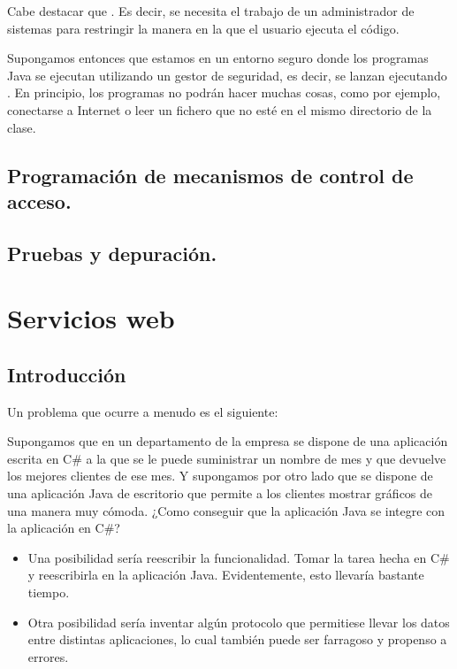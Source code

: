 \documentclass[letterpaper,10pt,spanish]{sphinxmanual}
\begin{document}
Cabe destacar que . Es decir, se necesita el trabajo de un administrador de sistemas para restringir la manera en la que el usuario ejecuta el código.

Supongamos entonces que estamos en un entorno seguro donde los programas Java se ejecutan utilizando un gestor de seguridad, es decir, se lanzan ejecutando . En principio, los programas no podrán hacer muchas cosas, como por ejemplo, conectarse a Internet o leer un fichero que no esté en el mismo directorio de la clase.


\section{Programación de mecanismos de control de acceso.}
\label{\detokenize{textos/tema5:programacion-de-mecanismos-de-control-de-acceso}}

\section{Pruebas y depuración.}
\label{\detokenize{textos/tema5:pruebas-y-depuracion}}

\chapter{Servicios web}
\label{\detokenize{textos/tema6:servicios-web}}\label{\detokenize{textos/tema6::doc}}

\section{Introducción}
\label{\detokenize{textos/tema6:introduccion}}
Un problema que ocurre a menudo es el siguiente: 

Supongamos que en un departamento de la empresa se dispone de una
aplicación escrita en C\# a la que se le puede suministrar un nombre de mes
y que devuelve los mejores clientes de ese mes. Y supongamos
por otro lado que se dispone de una aplicación Java de escritorio que
permite a los clientes mostrar gráficos de una manera muy cómoda. ¿Como
conseguir que la aplicación Java se integre con la aplicación en C\#?
\begin{itemize}
\item {} 
Una posibilidad sería reescribir la funcionalidad. Tomar la tarea hecha
en C\# y reescribirla en la aplicación Java. Evidentemente, esto llevaría bastante tiempo.

\item {} 
Otra posibilidad sería inventar algún protocolo que permitiese llevar los
datos entre distintas aplicaciones, lo cual también puede ser farragoso y
propenso a errores.

\end{itemize}
\end{document}
